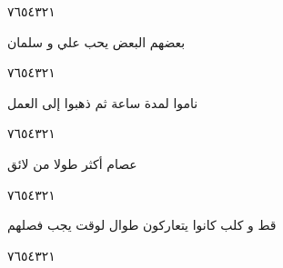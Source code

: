 \documentclass[11pt, a4paper]{article}
\begin{document}
{\begin{center}
        \hfill\textarabic{٧}\hfill\textarabic{٦}\hfill\textarabic{٥}\hfill\textarabic{٤}\hfill\textarabic{٣}\hfill\textarabic{٢}\hfill\textarabic{١}
        \end{center}


\vspace{0.5\baselineskip}\begin{flushright}
\textarabic{بعضهم البعض يحب علي و سلمان}
\end{flushright}

\begin{center}
        \hfill\textarabic{٧}\hfill\textarabic{٦}\hfill\textarabic{٥}\hfill\textarabic{٤}\hfill\textarabic{٣}\hfill\textarabic{٢}\hfill\textarabic{١}
        \end{center}


\vspace{0.5\baselineskip}\begin{flushright}
\textarabic{ناموا لمدة ساعة ثم ذهبوا إلى العمل}
\end{flushright}

\begin{center}
        \hfill\textarabic{٧}\hfill\textarabic{٦}\hfill\textarabic{٥}\hfill\textarabic{٤}\hfill\textarabic{٣}\hfill\textarabic{٢}\hfill\textarabic{١}
        \end{center}


\vspace{0.5\baselineskip}\begin{flushright}
\textarabic{عصام أكثر طولا من لائق}
\end{flushright}

\begin{center}
        \hfill\textarabic{٧}\hfill\textarabic{٦}\hfill\textarabic{٥}\hfill\textarabic{٤}\hfill\textarabic{٣}\hfill\textarabic{٢}\hfill\textarabic{١}
        \end{center}


\vspace{0.5\baselineskip}\begin{flushright}
\textarabic{قط و كلب كانوا يتعاركون طوال لوقت يجب فصلهم}
\end{flushright}

\begin{center}
        \hfill\textarabic{٧}\hfill\textarabic{٦}\hfill\textarabic{٥}\hfill\textarabic{٤}\hfill\textarabic{٣}\hfill\textarabic{٢}\hfill\textarabic{١}
        \end{center}


}
\end{document}
